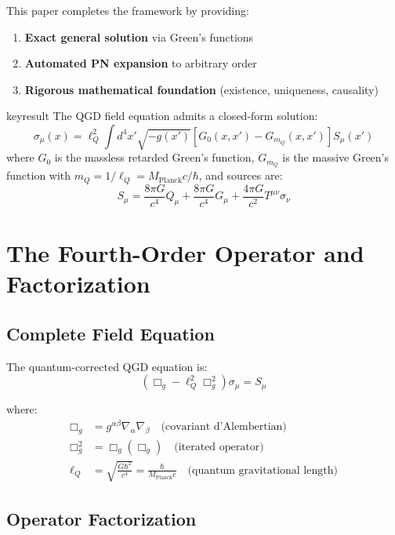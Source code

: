 \documentclass[11pt,a4paper]{article}
\theoremstyle{definition}
\theoremstyle{remark}
\begin{document}
		This paper completes the framework by providing:
		\begin{enumerate}
			\item \textbf{Exact general solution} via Green's functions
			\item \textbf{Automated PN expansion} to arbitrary order
			\item \textbf{Rigorous mathematical foundation} (existence, uniqueness, causality)
		\end{enumerate}
		
		keyresult
			The QGD field equation admits a closed-form solution:
			\begin{equation}
				\boxed{\sigma_\mu(x) = \ell_Q^2\int d^4x'\sqrt{-g(x')}\left[G_0(x,x') - G_{m_Q}(x,x')\right]S_\mu(x')}
			\end{equation}
			where $G_0$ is the massless retarded Green's function, $G_{m_Q}$ is the massive Green's function with $m_Q = 1/\ell_Q = M_{\text{Planck}}c/\hbar$, and sources are:
			\begin{equation}
				S_\mu = \frac{8\pi G}{c^4}Q_\mu + \frac{8\pi G}{c^4}G_\mu + \frac{4\pi G}{c^2}T^{\mu\nu}\sigma_\nu
			\end{equation}
		
		\section{The Fourth-Order Operator and Factorization}
		
		\subsection{Complete Field Equation}
		
		The quantum-corrected QGD equation is:
		\begin{equation}\label{eq:full_PU}
			\boxed{\left(\Box_g - \ell_Q^2\Box_g^2\right)\sigma_\mu = S_\mu}
		\end{equation}
		
		where:
		\begin{align}
			\Box_g &= g^{\alpha\beta}\nabla_\alpha\nabla_\beta \quad \text{(covariant d'Alembertian)}\\
			\Box_g^2 &= \Box_g(\Box_g) \quad \text{(iterated operator)}\\
			\ell_Q &= \sqrt{\frac{G\hbar^2}{c^4}} = \frac{\hbar}{M_{\text{Planck}}c} \quad \text{(quantum gravitational length)}
		\end{align}
		
		\subsection{Operator Factorization}
		
\end{document}
